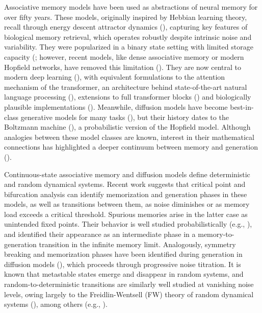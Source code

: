 \documentclass[12pt]{article}
\begin{document}
Associative memory models have been used as abstractions of neural memory for over fifty years. These models, originally inspired by Hebbian learning theory, recall through energy descent attractor dynamics (\cite{dayan2005theoretical}), capturing key features of biological memory retrieval, which operates robustly despite intrinsic noise and variability. They were popularized in a binary state setting with limited storage capacity (\cite{hopfield1982neural}; however, recent models, like dense associative memory or modern Hopfield networks, have removed this limitation (\cite{krotov2016dense, demircigil2017model}). They are now central to modern deep learning (\cite{krotov2023new}), with equivalent formulations to the attention mechanism of the transformer, an architecture behind state-of-the-art natural language processing (\cite{vaswani2017attention,ramsauer2020hopfield}), extensions to full transformer blocks (\cite{hoover2023energy}) and biologically plausible implementations (\cite{kozachkov2025neuron}). Meanwhile, diffusion models have become best-in-class generative models for many tasks (\cite{rombach2022high,ramesh2022hierarchical,cao2024survey}), but their history dates to the Boltzmann machine (\cite{ackley1985learning}), a probabilistic version of the Hopfield model. Although analogies between these model classes are known, interest in their mathematical connections has highlighted a deeper continuum between memory and generation (\cite{hoover2023memory, ambrogioni2024search}).

Continuous-state associative memory and diffusion models define deterministic and random dynamical systems. Recent work suggests that critical point and bifurcation analysis can identify memorization and generation phases in these models, as well as transitions between them, as noise diminishes or as memory load exceeds a critical threshold. Spurious memories arise in the latter case as unintended fixed points. Their behavior is well studied probabilistically (e.g., \cite{gayrard2025mixed}), and \cite{pham2025memorization} identified their appearance as an intermediate phase in a memory-to-generation transition in the infinite memory limit. Analogously, symmetry breaking and memorization phases have been identified during generation in diffusion models (\cite{raya2023spontaneous, biroli2024dynamical}), which proceeds through progressive noise titration. It is known that metastable states emerge and disappear in random systems, and random-to-deterministic transitions are similarly well studied at vanishing noise levels, owing largely to the Freidlin-Wentsell (FW) theory of random dynamical systems (\cite{ventsel1970small}), among others (e.g., \cite{bovier2001metastability,bovier2004metastability}). 
\end{document}
